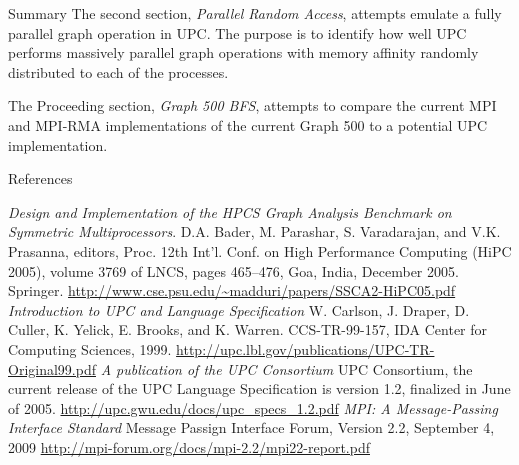 \documentclass[final]{beamer}
\begin{document}
\begin{frame}[t]
\begin{columns}[t]
\begin{column}{0.28\paperwidth}
\begin{block}{Summary}
					The second section, \emph{Parallel Random Access}, attempts emulate a fully parallel graph operation in UPC.  The purpose is to identify how well UPC performs massively parallel graph operations with memory affinity randomly distributed to each of the processes.  
			
					The Proceeding section, \emph{Graph 500 BFS}, attempts to compare the current MPI and MPI-RMA implementations of the current Graph 500 to a potential UPC implementation.
				\end{block}
				\begin{block}{References}
					\begin{thebibliography}{7}
						{\tiny
							\emph{Design and Implementation of the HPCS Graph Analysis Benchmark
on Symmetric Multiprocessors}. D.A. Bader, M. Parashar, S. Varadarajan, and V.K. Prasanna, editors, Proc. 12th Int'l. Conf. on High Performance Computing (HiPC 2005), volume 3769 of LNCS, pages 465--476, Goa, India, December 2005. Springer.
							\url{http://www.cse.psu.edu/~madduri/papers/SSCA2-HiPC05.pdf}
							\emph{Introduction to UPC and Language Specification}
							W. Carlson, J. Draper, D. Culler, K. Yelick, E. Brooks, and K. Warren. CCS-TR-99-157, IDA Center for Computing Sciences, 1999.
						  \url{http://upc.lbl.gov/publications/UPC-TR-Original99.pdf}
							\emph{A publication of the UPC Consortium}
							UPC Consortium, the current release of the UPC Language Specification is version 1.2, finalized in June of 2005.
							\url{http://upc.gwu.edu/docs/upc_specs_1.2.pdf}
							\emph{MPI: A Message-Passing Interface Standard} Message Passign Interface Forum, Version 2.2, September 4, 2009 
							\url{http://mpi-forum.org/docs/mpi-2.2/mpi22-report.pdf}
						}
					\end{thebibliography}
				\end{block}
			\end{column}
		\end{columns}
	\end{frame}
\end{document}
